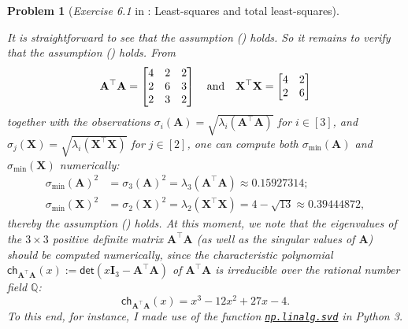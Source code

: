 \documentclass[11pt]{article}
\newtheorem{problem}{Problem}
\numberwithin{equation}{problem}
\begin{document}
\begin{problem} [\emph{Exercise 6.1} in \cite{calafiore2014optimization}: Least-squares and total least-squares]
{\begin{enumerate} [label=(\roman*)]
\end{enumerate}
It is straightforward to see that the assumption () holds. So it remains to verify that the assumption () holds. From
\begin{equation*}
    \mathbf{A}^{\top} \mathbf{A} =
    \begin{bmatrix}
        4 & 2 & 2 \\ 2 & 6 & 3 \\ 2 & 3 & 2
    \end{bmatrix} \quad \textnormal{and} \quad
    \mathbf{X}^{\top} \mathbf{X} =
    \begin{bmatrix}
        4 & 2 \\ 2 & 6
    \end{bmatrix}
\end{equation*}
together with the observations $\sigma_i (\mathbf{A}) = \sqrt{\lambda_i \left( \mathbf{A}^{\top} \mathbf{A} \right)}$ for $i \in [3]$, and $\sigma_j (\mathbf{X}) = \sqrt{\lambda_i \left( \mathbf{X}^{\top} \mathbf{X} \right)}$ for $j \in [2]$, one can compute both $\sigma_{\min} (\mathbf{A})$ and $\sigma_{\min} (\mathbf{X})$ numerically:
\begin{equation*}
    \begin{split}
        \sigma_{\min} (\mathbf{A})^2 &= \sigma_{3} (\mathbf{A})^2 = \lambda_3 \left( \mathbf{A}^{\top} \mathbf{A} \right) \approx 0.15927314; \\
        \sigma_{\min} (\mathbf{X})^2 &= \sigma_{2} (\mathbf{X})^2 = \lambda_2 \left( \mathbf{X}^{\top} \mathbf{X} \right) = 4 - \sqrt{13} \approx 0.39444872,
    \end{split}
\end{equation*}
thereby the assumption () holds. At this moment, we note that the eigenvalues of the $3 \times 3$ positive definite matrix $\mathbf{A}^{\top} \mathbf{A}$ (as well as the singular values of $\mathbf{A}$) should be computed numerically, since the characteristic polynomial $\textsf{ch}_{\mathbf{A}^{\top} \mathbf{A}}(x) := \textsf{det} \left( x \mathbf{I}_3 - \mathbf{A}^{\top} \mathbf{A} \right)$ of $\mathbf{A}^{\top} \mathbf{A}$ is irreducible over the rational number field $\mathbb{Q}$:
\begin{equation*}
    \textsf{ch}_{\mathbf{A}^{\top} \mathbf{A}}(x) = x^3 - 12 x^2 + 27 x - 4.
\end{equation*}
To this end, for instance, I made use of the function \href{https://numpy.org/doc/stable/reference/generated/numpy.linalg.svd.html}{\texttt{np.linalg.svd}} in Python 3. 
\medskip

}
\end{problem}
\end{document}
